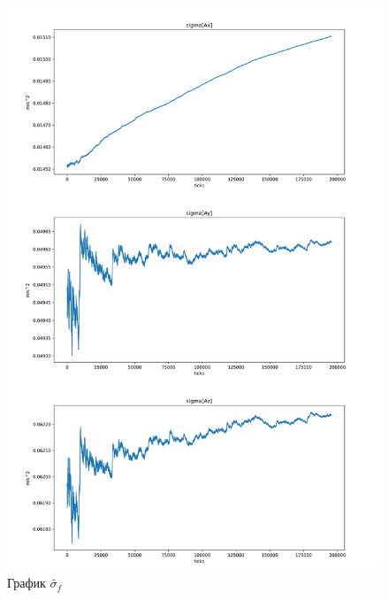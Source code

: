 \documentclass[a4paper,14pt]{article}
\theoremstyle{plain} %
\theoremstyle{definition} %
\theoremstyle{remark} %
\begin{document}
{\begin{figure}[h!]
    \centering
    \includegraphics[width=0.99\linewidth]{sigmaAfull.png}
    \caption{ График $\widetilde{\sigma_f}$}
    \label{fig:da}
\end{figure}

}
\end{document}

